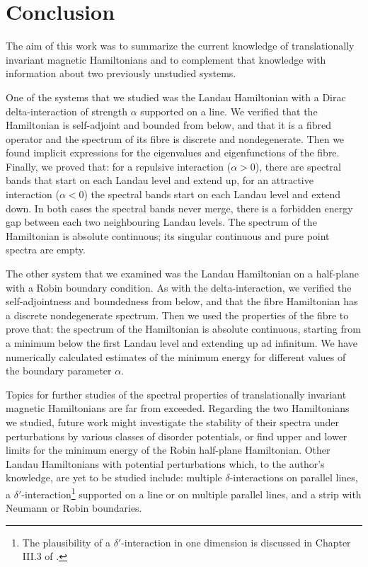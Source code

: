 \chapter*{Conclusion}

The aim of this work was to summarize the current knowledge of translationally invariant magnetic Hamiltonians and to complement that knowledge with information about two previously unstudied systems.

One of the systems that we studied was the Landau Hamiltonian with a Dirac delta-interaction of strength $\alpha$ supported on a line. We verified that the Hamiltonian is self-adjoint and bounded from below, and that it is a fibred operator and the spectrum of its fibre is discrete and nondegenerate. Then we found implicit expressions for the eigenvalues and eigenfunctions of the fibre. Finally, we proved that: for a repulsive interaction ($\alpha>0$), there are spectral bands that start on each Landau level and extend up, for an attractive interaction ($\alpha < 0$) the spectral bands start on each Landau level and extend down. In both cases the spectral bands never merge, there is a forbidden energy gap between each two neighbouring Landau levels. The spectrum of the Hamiltonian is absolute continuous; its singular continuous and pure point spectra are empty.

The other system that we examined was the Landau Hamiltonian on a half-plane with a Robin boundary condition. As with the delta-interaction, we verified the self-adjointness and boundedness from below, and that the fibre Hamiltonian has a discrete nondegenerate spectrum. Then we used the properties of the fibre to prove that: the spectrum of the Hamiltonian is absolute continuous, starting from a minimum below the first Landau level and extending up ad infinitum. We have numerically calculated estimates of the minimum energy for different values of the boundary parameter $\alpha$.

Topics for further studies of the spectral properties of translationally invariant magnetic Hamiltonians are far from exceeded. Regarding the two Hamiltonians we studied, future work might investigate the stability of their spectra under perturbations by various classes of disorder potentials, or find upper and lower limits for the minimum energy of the Robin half-plane Hamiltonian. Other Landau Hamiltonians with potential perturbations which, to the author's knowledge, are yet to be studied include: multiple $\delta$-interactions on parallel lines, a $\delta'$-interaction\footnote{The plausibility of a $\delta'$-interaction in one dimension is discussed in Chapter III.3 of \cite{Albeverio2005}.} supported on a line or on multiple parallel lines, and a strip with Neumann or Robin boundaries.
